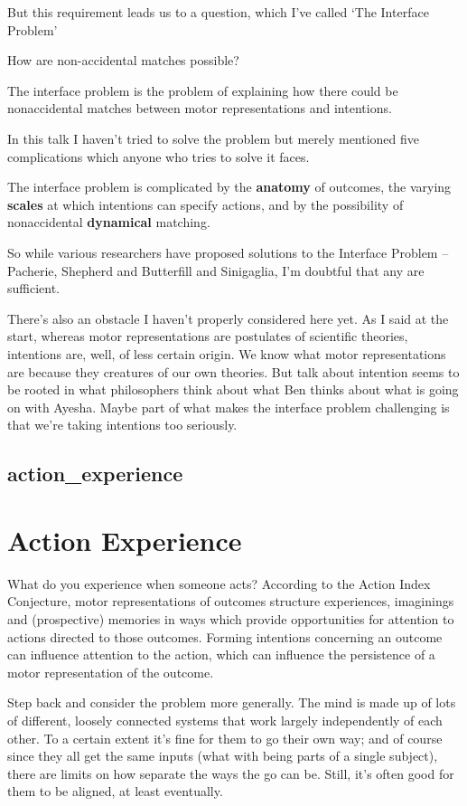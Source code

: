 \documentclass[12pt,\papersize]{extarticle}
\begin{document}
But this requirement leads us to a question, which I’ve called ‘The Interface Problem’
 
How are non-accidental matches possible?
 
The interface problem is the problem of explaining how there could be nonaccidental matches
between motor representations and intentions.
 
In this talk I haven’t tried to solve the problem but merely mentioned five complications
which anyone who tries to solve it faces.
 
The interface problem is complicated by the \textbf{anatomy} of outcomes, the varying \textbf{scales}
at which intentions can specify actions, and by the possibility of nonaccidental \textbf{dynamical}
matching.
 
So while various researchers have proposed solutions to the Interface Problem -- Pacherie, Shepherd and
Butterfill and Sinigaglia, I’m doubtful that any are sufficient.
 
There’s also an obstacle I haven’t properly considered here yet.
As I said at the start, whereas motor representations are postulates of
scientific theories, intentions are, well, of less certain origin.
We know what motor representations are because they creatures of our own theories.
But talk about intention seems to be rooted in what philosophers think about
what Ben thinks about what is going on with Ayesha.
Maybe part of what makes the interface problem challenging is that we’re taking
intentions too seriously.
 
\subsection{action\_experience}
 
 
\section{Action Experience}
 
What do you experience when someone acts?
According to the Action Index Conjecture,
motor representations of outcomes structure
experiences, imaginings and (prospective) memories
in ways which provide opportunities for attention to actions directed to those outcomes.
Forming intentions concerning an outcome can influence attention to the action,
which can influence the persistence of a motor representation of the outcome.
 
Step back and consider the problem more generally. The mind is made up of lots of different, loosely
connected systems that work largely independently of each other. To a certain extent it’s fine for
them to go their own way; and of course since they all get the same inputs (what with being parts of
a single subject), there are limits on how separate the ways the go can be. Still, it’s often good
for them to be aligned, at least eventually.
 
\end{document}
